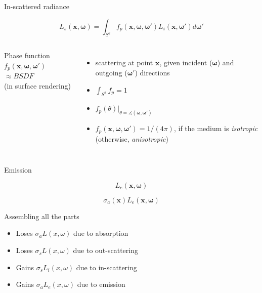 \documentclass[
  english,            %
  aspectratio=169,    %
]{tumbeamer}
\newcommand\bx[0]{\textbf{x}}
\newcommand\bomega[0]{\boldsymbol{\omega}}
\begin{document}
\begin{frame}{In-scattered radiance}
\begin{figure}[ht]
    \centering
    \scalebox{.6}{
        
    }
\end{figure}
$$ L_s(\bx, \bomega) = \int_{S^2} f_p(\bx, \bomega, \bomega') L_i(\bx, \bomega')
    d\bomega' $$

\begin{columns}[t, onlytextwidth]
    Phase function $f_p(\bx, \bomega, \bomega')$ \\
    \vspace{.3em}
    \scriptsize{$\approx BSDF$ \\(in surface rendering)}
    \begin{itemize}
        \item scattering at point $\bx$, given incident ($\bomega$) and outgoing
            ($\bomega'$) directions
        \item $\int_{S^2} f_p = 1$
        \item $f_p(\theta)\big|_{\theta = \measuredangle(\bomega, \bomega')}$
        \item $f_p(\bx, \bomega, \bomega') = 1/(4\pi)$, if the medium is
            \textit{isotropic}\\\hfill(otherwise, \textit{anisotropic})
    \end{itemize}
\end{columns}

\end{frame}


\begin{frame}{Emission}
\begin{figure}[ht]
    \centering
        
\end{figure}
$$L_e(\bx, \bomega)$$

$$\sigma_a(\boldsymbol{x})L_e(\bx, \bomega)$$
\end{frame}

\begin{frame}{Assembling all the parts}
    \begin{figure}[ht]
        \centering
        
        \label{fig:interactions}
    \end{figure}
    \begin{itemize}
        \item Loses $\sigma_a L(x, \omega)$ due to absorption
        \item Loses $\sigma_s L(x, \omega)$ due to out-scattering
        \item Gains $\sigma_s L_i(x, \omega)$ due to in-scattering
        \item Gains $\sigma_a L_e(x, \omega)$ due to emission
    \end{itemize}
\end{frame}
\end{document}
